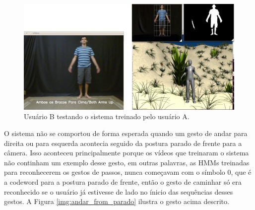 \begin{figure}[!htbp]
  \includegraphics[scale=0.35]{imagens/sistema_krishynan.jpg}
  \caption{Usuário B testando o sistema treinado pelo usuário A.}
  \label{img:sistema_krishynan}
\end{figure}

O sistema não se comportou de forma esperada quando um gesto de andar para direita ou para esquerda acontecia seguido da postura parado de frente para a câmera. Isso aconteceu principalmente porque os vídeos que treinaram o sistema não continham um exemplo desse gesto, em outras palavras, as HMMs treinadas para reconhecerem os gestos de passos, nunca começavam com o símbolo 0, que é a codeword para a postura parado de frente, então o gesto de caminhar só era reconhecido se o usuário já estivesse de lado no ínicio das sequências desses gestos. A Figura \ref{img:andar_from_parado} ilustra o gesto acima descrito.

